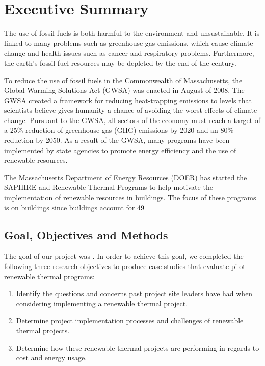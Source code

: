 \chapter*{Executive Summary}

\par The use of fossil fuels is both harmful to the environment and unsustainable. It is linked to many problems such as greenhouse gas emissions, which cause climate change and health issues such as cancer and respiratory problems. Furthermore, the earth's fossil fuel resources may be depleted by the end of the century.
\par To reduce the use of fossil fuels in the Commonwealth of Massachusetts, the Global Warming Solutions Act (GWSA) was enacted in August of 2008. The GWSA created a framework for reducing heat-trapping emissions to levels that scientists believe gives humanity a chance of avoiding the worst effects of climate change. Pursuant to the GWSA, all sectors of the economy must reach a target of a 25\% reduction of greenhouse gas (GHG) emissions by 2020 and an 80\% reduction by 2050. As a result of the GWSA, many programs have been implemented by state agencies to promote energy efficiency and the use of renewable resources.
\par The Massachusetts Department of Energy Resources (DOER) has started the SAPHIRE and Renewable Thermal Programs to help motivate the implementation of renewable resources in buildings. The focus of these programs is on buildings since buildings account for 49%

\section*{Goal, Objectives and Methods}
\par The goal of our project was \goal. In order to achieve this goal, we completed the following three research objectives to produce case studies that evaluate pilot renewable thermal programs:
\begin{enumerate}
  \item{Identify the questions and concerns past project site leaders have had when considering implementing a renewable thermal project.}
  \item{Determine project implementation processes and challenges of renewable thermal projects.}
  \item{Determine how these renewable thermal projects are performing in regards to cost and energy usage.}
\end{enumerate}

